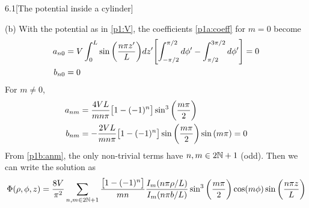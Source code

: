 \documentclass[12pt]{article}
\begin{document}
\begin{problem}{6.1}[The potential inside a cylinder]
\begin{solution}
(b) With the potential as in \eqref{p1:V}, the coefficients \eqref{p1a:coeff} 
for $m=0$ become
\begin{subequations} 
    \begin{align}
        a_{n0}&=
            V\int_0^L\sin\qty(\frac{n\pi z'}{L})dz'
            \qty[\int_{-\pi/2}^{\pi/2}d\phi'-\int_{\pi/2}^{3\pi/2}d\phi']=0\notag\\
        b_{n0}&=0
    \end{align}
\end{subequations}
For $m\neq 0$,
\begin{subequations}
    \begin{align}
        a_{nm}
        &=\frac{4VL}{mn\pi}\qty[1-(-1)^n]\sin^3\qty(\frac{m\pi}{2})\label{p1b:anm}\\
        b_{nm}
        &=-\frac{2VL}{mn\pi}\qty[1-(-1)^n]\sin\qty(\frac{m\pi}{2})\sin\qty(m\pi)
        =0
    \end{align} 
\end{subequations}
From \eqref{p1b:anm}, the only non-trivial terms have $n,m\in 2\mathbb{N}+1$ (odd). Then
we can write the solution as
\begin{equation}
    \Phi(\rho,\phi,z)
    =\frac{8V}{\pi^2}\sum_{n,m\in
    2\mathbb{N}+1}\frac{\qty[1-(-1)^n]}{mn}\frac{I_m(n\pi\rho/L)}{I_m(n\pi b/L)}
        \sin^3\qty(\frac{m\pi}{2})\cos(m\phi)\sin\qty(\frac{n\pi z}{L})
\end{equation}
\end{solution}
\end{problem}
\end{document}
